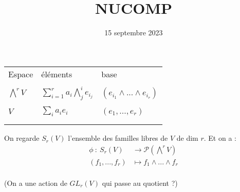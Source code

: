 \documentclass[12pt]{article}
\title{NUCOMP}
\date{15 septembre 2023}
\theoremstyle{plain}
\begin{document}
\maketitle

\begin{center}
\begin{tabular}{M{4 cm} M{4 cm} M{4 cm}}
    Espace & éléments & base \\
    \tabularnewline
    $\bigwedge^r V$ & $\sum_{i=1}^{r} a_i \bigwedge_j^i e_{i_j}$  & $(e_{i_1}\wedge...\wedge e_{i_r})$\\
    \tabularnewline 
    $V$&$\sum_i a_ie_i$ &$(e_1,...,e_r)$  \\
    \tabularnewline
    & \tabularnewline
  
    
\end{tabular}
\end{center}

On regarde $S_r(V)$ l'ensemble des familles libres de $V$ de dim $r$. Et on a :
\begin{align*}
    \phi~:~S_r(V)&\rightarrow \mathcal{P}(\bigwedge^r V)\\
    (f_1,...,f_r)&\mapsto f_1\wedge ...\wedge f_r\\
\end{align*}

(On a une action de $GL_r(V)$ qui passe au quotient ?)
\end{document}
